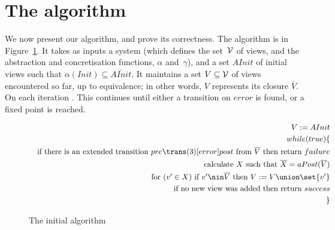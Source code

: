 \section{The algorithm}

We now present our algorithm, and prove its correctness.  The algorithm is in
Figure~\ref{fig:algorithm}.  It takes as inputs a system (which defines the
set~$\mathcal{V}$ of views, and the abstraction and concretisation functions, $\alpha$
and~$\gamma$), and a set $AInit$ of initial views such that $\alpha(Init)
\subseteq \overline{AInit}$.  It maintains a set $V \subseteq \mathcal{V}$ of views
encountered so far, up to equivalence; in other words, $V$ represents its
closure $\overline{V}$.  On each iteration \framebox{\ldots}.  This continues
until either a transition on $error$ is found, or a fixed point is reached. 

\begin{figure}[t]
\[
\begin{align}
V := AInit \\
while(true)\{ \\
\quad \mbox{if there is an extended transition $pre \trans(3)[error] post$
  from~$\overline{V}$ then return $failure$} \\
\quad \mbox{calculate $X$ such that $\overline{X} = aPost(\overline{V})$} \\
\quad \mbox{for $(v' \in X)$ if $v' \nin \overline{V}$ then 
  $V := V \union \set{v'}$} \\
\quad \mbox{if no new view was added then return $success$} \\ 
\}
\end{align}
\]
\caption{The initial algorithm}
\label{fig:algorithm}
\end{figure}


